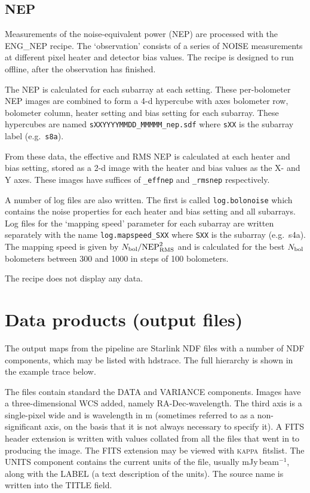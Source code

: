 \documentclass[twoside,11pt,nolof]{starlink}
\providecommand{\KAPPA}{\textsc{kappa}}
\providecommand{\task}[1]{\textsf{#1}}
\begin{document}
\subsection{NEP}

Measurements of the noise-equivalent power (NEP) are processed with
the \task{ENG\_NEP} recipe. The `observation' consists of a series of
NOISE measurements at different pixel heater and detector bias
values. The recipe is designed to run offline, after the observation
has finished.

The NEP is calculated for each subarray at each setting. These
per-bolometer NEP images are combined to form a 4-d hypercube with
axes bolometer row, bolometer column, heater setting and bias setting
for each subarray. These hypercubes are named
\verb+sXXYYYYMMDD_MMMMM_nep.sdf+ where \verb+sXX+ is the subarray
label (e.g.\ \verb+s8a+).

From these data, the effective and RMS NEP is calculated at each
heater and bias setting, stored as a 2-d image with the heater and
bias values as the X- and Y axes. These images have suffices of
\verb+_effnep+ and \verb+_rmsnep+ respectively.

A number of log files are also written. The first is called
\verb+log.bolonoise+ which contains the noise properties for each
heater and bias setting and all subarrays. Log files for the `mapping
speed' parameter for each subarray are written separately with the
name \verb+log.mapspeed_SXX+ where \verb+SXX+ is the subarray
(e.g.\ s4a). The mapping speed is given by $N_{\rm bol} / {\rm
  NEP}_{\rm RMS}^2$ and is calculated for the best $N_{\rm bol}$
bolometers between 300 and 1000 in steps of 100 bolometers.

The recipe does not display any data.

\section{Data products (output files)\label{se:dataprod}}

The output maps from the pipeline are Starlink NDF files with a number
of NDF components, which may be listed with \task{hdstrace}. The
full hierarchy is shown in the example trace below.

The files contain standard the DATA and VARIANCE components. Images
have a three-dimensional WCS added, namely RA-Dec-wavelength. The
third axis is a single-pixel wide and is wavelength in m (sometimes
referred to as a non-significant axis, on the basis that it is not
always necessary to specify it). A FITS header extension is written
with values collated from all the files that went in to producing the
image. The FITS extension may be viewed with
\KAPPA\ \task{fitslist}. The UNITS component contains the current units
of the file, usually mJy\,beam$^{-1}$, along with the LABEL (a text
description of the units). The source name is written into the TITLE
field.
\end{document}

